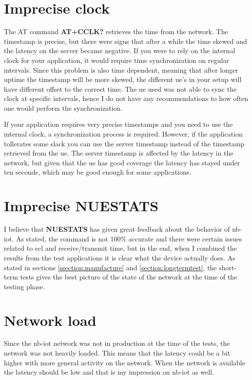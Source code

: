 \documentclass[USenglish]{ifimaster}  %
\begin{document}
\section{Imprecise clock}
The AT command \textbf{AT+CCLK?} retrieves the time from the network. The timestamp is precise, but there were signs that after a while the time skewed and the latency on the server became negative. If you were to rely on the internal clock for your application, it would require time synchronization on regular intervals. Since this problem is also time dependent, meaning that after longer uptime the timestamp will be more skewed, the different \acrshort{ue}'s in your setup will have different offset to the correct time. The \acrshort{ue} used was not able to sync the clock at specific intervals, hence I do not have any recommendations to how often one would perform the synchronization.

If your application requires very precise timestamps and you need to use the internal clock, a synchronization process is required. However, if the application tollerates some slack you can use the server timestamp instead of the timestamp retrieved from the \acrshort{ue}. The server timestamp is affected by the latency in the network, but given that the \acrshort{ue} has good coverage the latency has stayed under ten seconds, which may be good enough for some applications.

\section{Imprecise \textbf{NUESTATS}}
I believe that \textbf{NUESTATS} has given great feedback about the behavior of \acrshort{nb-iot}. As stated, the command is not 100\% accurate and there were certain issues related to \acrshort{ecl} and receive/transmit time, but in the end, when I combined the results from the test applications it is clear what the device actually does. As stated in sections \vref{ssection:manufacture} and \vref{section:longtermtest}, the short-term tests gives the best picture of the state of the network at the time of the testing phase.

\section{Network load}
Since the \acrshort{nb-iot} network was not in production at the time of the tests, the network was not heavily loaded. This means that the latency could be a bit higher with more general activity on the network. When the network is available the latency should be low and that is my impression on \acrshort{nb-iot} as well.
\end{document}

